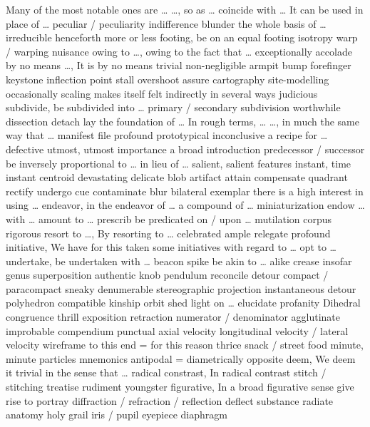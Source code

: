 \documentclass[12pt]{article}
\begin{document}
Many of the most notable ones are \dots 
\dots, so as \dots 
coincide with \dots 
It can be used in place of \dots 
peculiar / peculiarity 
indifference 
blunder 
the whole basis of \dots 
irreducible 
henceforth 
more or less 
footing, be on an equal footing 
isotropy 
warp / warping 
nuisance 
owing to \dots, owing to the fact that \dots 
exceptionally 
accolade 
by no means \dots, It is by no means trivial 
non-negligible 
armpit 
bump 
forefinger 
keystone 
inflection point 
stall 
overshoot 
assure 
cartography 
site-modelling 
occasionally 
scaling makes itself felt indirectly in several ways 
judicious 
subdivide, be subdivided into \dots 
primary / secondary 
subdivision 
worthwhile 
dissection 
detach 
lay the foundation of \dots 
In rough terms, \dots 
\dots, in much the same way that \dots 
manifest file 
profound 
prototypical 
inconclusive 
a recipe for \dots 
defective 
utmost, utmost importance 
a broad introduction 
predecessor / successor 
be inversely proportional to \dots 
in lieu of \dots 
salient, salient features 
instant, time instant 
centroid 
devastating 
delicate 
blob 
artifact 
attain 
compensate 
quadrant 
rectify 
undergo 
cue 
contaminate 
blur 
bilateral 
exemplar 
there is a high interest in using \dots 
endeavor, in the endeavor of \dots 
a compound of \dots 
miniaturization 
endow \dots with \dots 
amount to \dots 
prescrib 
be predicated on / upon \dots 
mutilation 
corpus 
rigorous 
resort to \dots, By resorting to \dots 
celebrated 
ample 
relegate 
profound 
initiative, We have for this taken some initiatives with regard to \dots 
opt to \dots 
undertake, be undertaken with \dots 
beacon 
spike 
be akin to \dots 
alike 
crease 
insofar 
genus 
superposition 
authentic 
knob 
pendulum 
reconcile 
detour 
compact / paracompact 
sneaky 
denumerable 
stereographic projection 
instantaneous 
detour 
polyhedron 
compatible 
kinship 
orbit 
shed light on \dots 
elucidate 
profanity 
Dihedral 
congruence 
thrill 
exposition 
retraction 
numerator / denominator 
agglutinate 
improbable 
compendium 
punctual 
axial velocity 
longitudinal velocity / lateral velocity 
wireframe 
to this end = for this reason 
thrice 
snack / street food 
minute, minute particles 
mnemonics 
antipodal = diametrically opposite 
deem, We deem it trivial in the sense that \dots 
radical constrast, In radical contrast 
stitch / stitching 
treatise 
rudiment 
youngster 
figurative, In a broad figurative sense 
give rise to 
portray 
diffraction / refraction / reflection 
deflect 
substance 
radiate 
anatomy 
holy grail 
iris / pupil 
eyepiece 
diaphragm 
\end{document}
